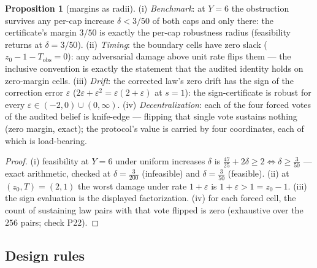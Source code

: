 \documentclass[10pt,twocolumn]{article}
\theoremstyle{definition}
\newtheorem{proposition}{Proposition}
\begin{document}
\begin{proposition}[margins as radii]\label{prop:margins}
(i) \emph{Benchmark}: at \(Y = 6\) the obstruction survives any
per-cap increase \(\delta < 3/50\) of both caps and only there: the
certificate's margin \(3/50\) is exactly the per-cap robustness radius
(feasibility returns at \(\delta = 3/50\)). (ii) \emph{Timing}: the
boundary cells have zero slack (\(z_0 - 1 - T_{\mathrm{obs}} = 0\)):
any adversarial damage above unit rate flips them --- the inclusive
convention is exactly the statement that the audited identity holds on
zero-margin cells. (iii) \emph{Drift}: the corrected law's zero drift
has the sign of the correction error \(\varepsilon\) (\(2\varepsilon +
\varepsilon^2 = \varepsilon(2 + \varepsilon)\) at \(s = 1\)): the
sign-certificate is robust for every \(\varepsilon \in (-2, 0) \cup
(0, \infty)\). (iv) \emph{Decentralization}: each of the four forced
votes of the audited belief is knife-edge --- flipping that single vote
sustains nothing (zero margin, exact); the protocol's value is carried
by four coordinates, each of which is load-bearing.
\end{proposition}

\begin{proof}
(i) feasibility at \(Y = 6\) under uniform increases \(\delta\) is
\(\tfrac{47}{25} + 2\delta \ge 2 \iff \delta \ge
\tfrac{3}{50}\) --- exact arithmetic, checked at \(\delta =
\tfrac{3}{200}\) (infeasible) and \(\delta = \tfrac{3}{50}\)
(feasible). (ii) at \((z_0, T) = (2, 1)\) the worst damage under rate
\(1 + \varepsilon\) is \(1 + \varepsilon > 1 = z_0 - 1\). (iii) the
sign evaluation is the displayed factorization. (iv) for each forced
cell, the count of sustaining law pairs with that vote flipped is zero
(exhaustive over the \(256\) pairs; check P22).
\end{proof}

\subsection{Design rules}\label{rules}
\end{document}
